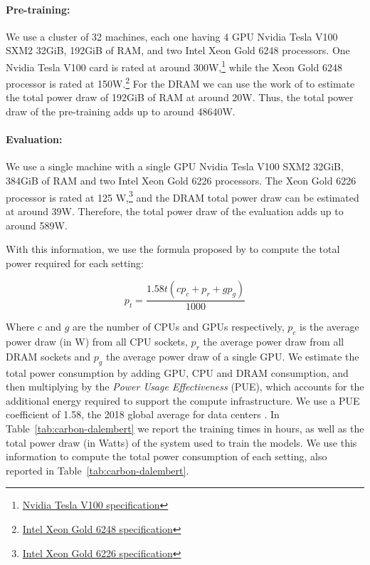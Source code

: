 \paragraph{Pre-training:} We use a cluster of 32 machines, each one having 4 GPU Nvidia Tesla V100 SXM2 32GiB, 192GiB of RAM, and two Intel Xeon Gold 6248 processors. One Nvidia Tesla V100 card is rated at around 300W,\footnote{\href{https://www.nvidia.com/en-us/data-center/v100/}{ Nvidia Tesla V100 specification}} while the Xeon Gold 6248 processor is rated at 150W.\footnote{\href{https://ark.intel.com/content/www/us/en/ark/products/192446/intel-xeon-gold-6248-processor-27-5m-cache-2-50-ghz.html}{Intel Xeon Gold 6248 specification}} For the DRAM we can use the work of  to estimate the total power draw of 192GiB of RAM at around 20W. Thus, the total power draw of the pre-training adds up to around 48640W.

\paragraph{Evaluation:} We use a single machine with a single GPU Nvidia Tesla V100 SXM2 32GiB, 384GiB of RAM and two Intel Xeon Gold 6226 processors. The Xeon Gold 6226 processor is rated at 125 W,\footnote{\href{https://ark.intel.com/content/www/us/en/ark/products/193957/intel-xeon-gold-6226-processor-19-25m-cache-2-70-ghz.html}{Intel Xeon Gold 6226 specification}} and the DRAM total power draw can be estimated at around 39W. Therefore, the total power draw of the evaluation adds up to around 589W.

With this information, we use the formula proposed by  to compute the total power required for each setting:

\begin{equation*}
    p_t = \frac{1.58t(cp_{c} + p_r + gp_g)}{1000}
\end{equation*}

Where $c$ and $g$ are the number of CPUs and GPUs respectively, $p_c$ is the average power draw (in W) from all CPU sockets, $p_r$ the average power draw from all DRAM sockets and $p_g$ the average power draw of a single GPU. We estimate the total power consumption by adding GPU, CPU and DRAM consumption, and then multiplying by the \emph{Power Usage Effectiveness} (PUE), which accounts for the additional energy required to support the compute infrastructure. We use a PUE coefficient of 1.58, the 2018 global average for data centers \cite{strubell-etal-2019-energy}. In Table~\ref{tab:carbon-dalembert} we report the training times in hours, as well as the total power draw (in Watts) of the system used to train the models. We use this information to compute the total power consumption of each setting, also reported in Table~\ref{tab:carbon-dalembert}.

